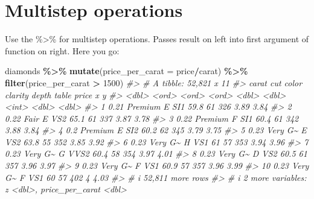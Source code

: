 \documentclass[
]{book}
\newenvironment{Shaded}{\begin{snugshade}}{\end{snugshade}}
\newcommand{\AttributeTok}[1]{\textcolor[rgb]{0.13,0.29,0.53}{#1}}
\newcommand{\CommentTok}[1]{\textcolor[rgb]{0.56,0.35,0.01}{\textit{#1}}}
\newcommand{\DecValTok}[1]{\textcolor[rgb]{0.00,0.00,0.81}{#1}}
\newcommand{\FunctionTok}[1]{\textcolor[rgb]{0.13,0.29,0.53}{\textbf{#1}}}
\newcommand{\NormalTok}[1]{#1}
\newcommand{\SpecialCharTok}[1]{\textcolor[rgb]{0.81,0.36,0.00}{\textbf{#1}}}
\begin{document}
\section*{Multistep operations}\label{multistep-operations}

Use the \%\textgreater\% for multistep operations. Passes result on left into first
argument of function on right. Here you go:

\begin{Shaded}
\begin{Highlighting}[]
\NormalTok{diamonds }\SpecialCharTok{\%\textgreater{}\%} 
  \FunctionTok{mutate}\NormalTok{(}\AttributeTok{price\_per\_carat =}\NormalTok{ price}\SpecialCharTok{/}\NormalTok{carat)  }\SpecialCharTok{\%\textgreater{}\%}
  \FunctionTok{filter}\NormalTok{(price\_per\_carat }\SpecialCharTok{\textgreater{}} \DecValTok{1500}\NormalTok{)}
\CommentTok{\#\textgreater{} \# A tibble: 52,821 x 11}
\CommentTok{\#\textgreater{}    carat cut     color clarity depth table price     x     y}
\CommentTok{\#\textgreater{}    \textless{}dbl\textgreater{} \textless{}ord\textgreater{}   \textless{}ord\textgreater{} \textless{}ord\textgreater{}   \textless{}dbl\textgreater{} \textless{}dbl\textgreater{} \textless{}int\textgreater{} \textless{}dbl\textgreater{} \textless{}dbl\textgreater{}}
\CommentTok{\#\textgreater{}  1  0.21 Premium E     SI1      59.8    61   326  3.89  3.84}
\CommentTok{\#\textgreater{}  2  0.22 Fair    E     VS2      65.1    61   337  3.87  3.78}
\CommentTok{\#\textgreater{}  3  0.22 Premium F     SI1      60.4    61   342  3.88  3.84}
\CommentTok{\#\textgreater{}  4  0.2  Premium E     SI2      60.2    62   345  3.79  3.75}
\CommentTok{\#\textgreater{}  5  0.23 Very G\textasciitilde{} E     VS2      63.8    55   352  3.85  3.92}
\CommentTok{\#\textgreater{}  6  0.23 Very G\textasciitilde{} H     VS1      61      57   353  3.94  3.96}
\CommentTok{\#\textgreater{}  7  0.23 Very G\textasciitilde{} G     VVS2     60.4    58   354  3.97  4.01}
\CommentTok{\#\textgreater{}  8  0.23 Very G\textasciitilde{} D     VS2      60.5    61   357  3.96  3.97}
\CommentTok{\#\textgreater{}  9  0.23 Very G\textasciitilde{} F     VS1      60.9    57   357  3.96  3.99}
\CommentTok{\#\textgreater{} 10  0.23 Very G\textasciitilde{} F     VS1      60      57   402  4     4.03}
\CommentTok{\#\textgreater{} \# i 52,811 more rows}
\CommentTok{\#\textgreater{} \# i 2 more variables: z \textless{}dbl\textgreater{}, price\_per\_carat \textless{}dbl\textgreater{}}
\end{Highlighting}
\end{Shaded}
\end{document}
